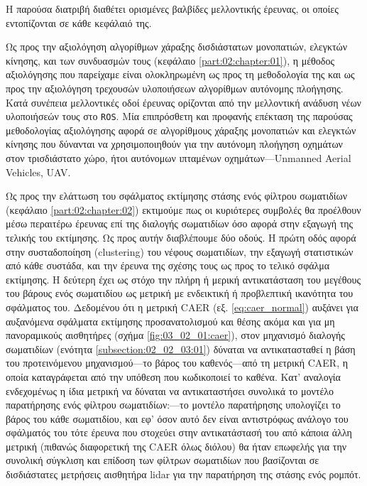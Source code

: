 Η παρούσα διατριβή διαθέτει ορισμένες βαλβίδες μελλοντικής έρευνας, οι οποίες
εντοπίζονται σε κάθε κεφάλαιό της.

Ως προς την αξιολόγηση αλγορίθμων χάραξης δισδιάστατων μονοπατιών, ελεγκτών
κίνησης, και των συνδυασμών τους (κεφάλαιο \ref{part:02:chapter:01}), η μέθοδος
αξιολόγησης που παρείχαμε είναι ολοκληρωμένη ως προς τη μεθοδολογία της και ως
προς την αξιολόγηση τρεχουσών υλοποιήσεων αλγορίθμων αυτόνομης πλοήγησης. Κατά
συνέπεια μελλοντικές οδοί έρευνας ορίζονται από την μελλοντική ανάδυση νέων
υλοποιήσεών τους στο \texttt{ROS}. Μία επιπρόσθετη και προφανής επέκταση της
παρούσας μεθοδολογίας αξιολόγησης αφορά σε αλγορίθμους χάραξης μονοπατιών και
ελεγκτών κίνησης που δύνανται να χρησιμοποιηθούν για την αυτόνομη πλοήγηση
οχημάτων στον τρισδιάστατο χώρο, ήτοι αυτόνομων ιπταμένων οχημάτων---Unmanned
Aerial Vehicles, UAV.

Ως προς την ελάττωση του σφάλματος εκτίμησης στάσης ενός φίλτρου σωματιδίων
(κεφάλαιο \ref{part:02:chapter:02}) εκτιμούμε πως οι κυριότερες συμβολές θα
προέλθουν μέσω περαιτέρω έρευνας επί της διαλογής σωματιδίων όσο αφορά στην
εξαγωγή της τελικής του εκτίμησης. Ως προς αυτήν διαβλέπουμε δύο οδούς. Η πρώτη
οδός αφορά στην συσταδοποίηση (clustering) του νέφους σωματιδίων, την εξαγωγή
στατιστικών από κάθε συστάδα, και την έρευνα της σχέσης τους ως προς το τελικό
σφάλμα εκτίμησης.  Η δεύτερη έχει ως στόχο την πλήρη ή μερική αντικατάσταση του
μεγέθους του βάρους ενός σωματιδίου ως μετρική με ενδεικτική ή προβλεπτική
ικανότητα του σφάλματος του.  Δεδομένου ότι η μετρική CAER (εξ.
\ref{eq:caer_normal}) αυξάνει για αυξανόμενα σφάλματα εκτίμησης προσανατολισμού
και θέσης ακόμα και για μη πανοραμικούς αισθητήρες (σχήμα
\ref{fig:03_02_01:caer}), στον μηχανισμό διαλογής σωματιδίων (ενότητα
\ref{subsection:02_02_03:01}) δύναται να αντικατασταθεί η βάση του
προτεινόμενου μηχανισμού---το βάρος του καθενός---από τη μετρική CAER, η οποία
καταγράφεται από την υπόθεση που κωδικοποιεί το καθένα. Κατ' αναλογία
ενδεχομένως η ίδια μετρική να δύναται να αντικαταστήσει συνολικά το μοντέλο
παρατήρησης ενός φίλτρου σωματιδίων:---το μοντέλο παρατήρησης υπολογίζει το
βάρος του κάθε σωματιδίου, και εφ' όσον αυτό δεν είναι αντιστρόφως ανάλογο του
σφάλματός του τότε έρευνα που στοχεύει στην αντικατάστασή του από κάποια άλλη
μετρική (πιθανώς διαφορετική της CAER όλως διόλου) θα ήταν επωφελής για την
συνολική σύγκλιση και επίδοση των φίλτρων σωματιδίων που βασίζονται σε
δισδιάστατες μετρήσεις αισθητήρα lidar για την παρατήρηση της στάσης ενός
ρομπότ.

